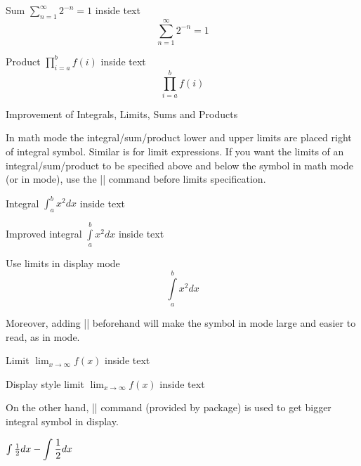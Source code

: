 \begin{frame}[fragile]

\begin{latexexample}
Sum $\sum_{n=1}^{\infty} 2^{-n} = 1$ inside text
\[ \sum_{n=1}^{\infty} 2^{-n} = 1 \]
\end{latexexample}


\begin{latexexample}
Product $\prod_{i=a}^{b} f(i)$ inside text
\[ \prod_{i=a}^{b} f(i) \]
\end{latexexample}
\end{frame}

\begin{frame}[fragile]{Improvement of Integrals, Limits, Sums and Products}

In  math mode the integral/sum/product lower and upper limits are placed right of integral symbol. Similar is for limit expressions. If you want the limits of an integral/sum/product to be specified above and below the symbol in  math mode (or in  mode), use the \LC|\limits| command before limits specification.

\begin{latexexample}
Integral $\int_{a}^{b} x^2 dx$ inside text \par
Improved integral $\int\limits_{a}^{b} x^2 dx$ inside text \par
Use limits in display mode \[ \int\limits_{a}^{b} x^2 dx \]
\end{latexexample}

\end{frame}

\begin{frame}[fragile]

Moreover, adding \LC|\displaystyle| beforehand will make the symbol in  mode large and easier to read, as in  mode.

\begin{latexexample}
Limit $\lim_{x\to\infty} f(x)$ inside text \par
Display style limit $\displaystyle\lim_{x\to\infty} f(x)$ inside text 
\end{latexexample}

On the other hand, \LC|\mathlarger| command (provided by  package) is used to get bigger integral symbol in display.

\begin{latexexample}
$\int\frac{1}{2}dx - \mathlarger{ \int\frac{1}{2}dx}$
\end{latexexample}

\end{frame}

